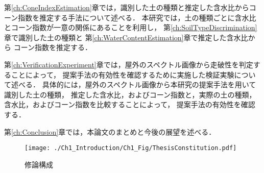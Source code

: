 第\ref{ch:ConeIndexEstimation}章では，識別した土の種類と推定した含水比からコーン指数を推定する手法について述べる．
本研究では，土の種類ごとに含水比とコーン指数が一意の関係にあることを利用し，
第\ref{ch:SoilTypeDiscrimination}章で識別した土の種類と
第\ref{ch:WaterContentEstimation}章で推定した含水比から
コーン指数を推定する．

第\ref{ch:VerificationExperiment}章では，屋外のスペクトル画像から走破性を判定することによって，
提案手法の有効性を確認するために実施した検証実験について述べる．
具体的には，屋外のスペクトル画像から本研究の提案手法を用いて識別した土の種類，
推定した含水比，およびコーン指数と，実際の土の種類，含水比，およびコーン指数を比較することによって，
提案手法の有効性を確認する．

第\ref{ch:Conclusion}章では，本論文のまとめと今後の展望を述べる．

\begin{figure}[pb]
	\begin{center}
	\centering
	\texttt{[image: ./Ch1\_Introduction/Ch1\_Fig/ThesisConstitution.pdf]}
	\caption{修論構成}\label{fig:MThesisConstitution}
	\end{center}
\end{figure}

\clearpage


